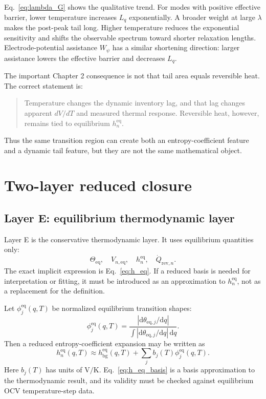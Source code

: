 \documentclass[11pt,a4paper]{article}
\newcommand{\dd}{\mathrm{d}}
\newcommand{\eqs}{\mathrm{eq}}
\newcommand{\rev}{\mathrm{rev}}
\newcommand{\bg}{\mathrm{bg}}
\begin{document}
Eq.~\eqref{eq:lambda_G} shows the qualitative trend. For modes with positive effective barrier,
lower temperature increases \(L_q\) exponentially. A broader weight at large \(\lambda\) makes the post-peak
tail long. Higher temperature reduces the exponential sensitivity and shifts the observable spectrum toward
shorter relaxation lengths. Electrode-potential assistance \(W_\psi\) has a similar shortening direction:
larger assistance lowers the effective barrier and decreases \(L_q\).

The important Chapter 2 consequence is not that tail area equals reversible heat. The correct statement is:
\begin{quote}
Temperature changes the dynamic inventory lag, and that lag changes apparent \(dV/dT\) and measured thermal
response. Reversible heat, however, remains tied to equilibrium \(h_n^{\eqs}\).
\end{quote}

Thus the same transition region can create both an entropy-coefficient feature and a dynamic tail feature, but
they are not the same mathematical object.

\section{Two-layer reduced closure}\label{sec:two_layer}

\subsection{Layer E: equilibrium thermodynamic layer}\label{sec:layer_E}

Layer E is the conservative thermodynamic layer. It uses equilibrium quantities only:
\[
\Theta_{\eqs},\quad V_{n,\eqs},\quad h_n^{\eqs},\quad \dot Q_{\rev,n}.
\]
The exact implicit expression is Eq.~\eqref{eq:h_eq}. If a reduced basis is needed for interpretation or
fitting, it must be introduced as an approximation to \(h_n^{\eqs}\), not as a replacement for the definition.

Let \(\phi_j^{\eqs}(q,T)\) be normalized equilibrium transition shapes:
\begin{equation}
\phi_j^{\eqs}(q,T)
=
\frac{\left|\dd\theta_{\eqs,j}/\dd q\right|}
{\int \left|\dd\theta_{\eqs,j}/\dd q\right|\,\dd q}.
\label{eq:phi_eq}
\end{equation}
Then a reduced entropy-coefficient expansion may be written as
\begin{equation}
h_n^{\eqs}(q,T)
\approx
h_{\bg}^{\eqs}(q,T)
+
\sum_j b_j(T)\phi_j^{\eqs}(q,T).
\label{eq:h_eq_basis}
\end{equation}
Here \(b_j(T)\) has units of \(\mathrm{V/K}\). Eq.~\eqref{eq:h_eq_basis} is a basis approximation to the
thermodynamic result, and its validity must be checked against equilibrium OCV temperature-step data.
\end{document}

